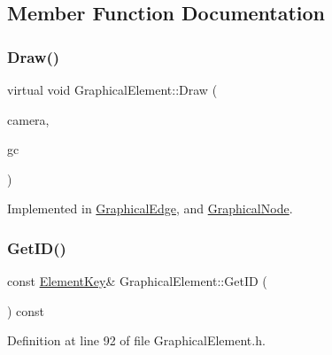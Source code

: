 \subsection{Member Function Documentation}
\mbox{\label{class_graphical_element_ab137d6d3ad82fd08b5610519dda0c600}} 
\subsubsection{\texorpdfstring{Draw()}{Draw()}}
{\footnotesize\ttfamily virtual void Graphical\+Element\+::\+Draw (\begin{DoxyParamCaption}\item[{const wx\+Affine\+Matrix2D \&}]{camera,  }\item[{wx\+Graphics\+Context $\ast$}]{gc }\end{DoxyParamCaption})\hspace{0.3cm}{\ttfamily [pure virtual]}}



Implemented in \hyperlink{class_graphical_edge_a48170a7fc9e86d92985d694addca8837}{Graphical\+Edge}, and \hyperlink{class_graphical_node_a5675edef9951820c61973cd8fb242287}{Graphical\+Node}.

\mbox{\label{class_graphical_element_a09ed630bc819c852f96ed20dda8d84e8}} 
\subsubsection{\texorpdfstring{Get\+I\+D()}{GetID()}}
{\footnotesize\ttfamily const \hyperlink{_graphical_element_8h_ade5fd6c85839a416577ff9de1605141e}{Element\+Key}\& Graphical\+Element\+::\+Get\+ID (\begin{DoxyParamCaption}{ }\end{DoxyParamCaption}) const\hspace{0.3cm}{\ttfamily [inline]}}



Definition at line 92 of file Graphical\+Element.\+h.

